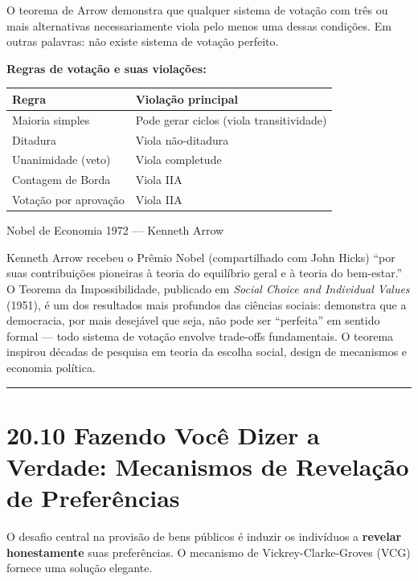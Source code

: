\documentclass[11pt,twoside,openright]{book}
\begin{document}
O teorema de Arrow demonstra que qualquer sistema de votação com três ou
mais alternativas necessariamente viola pelo menos uma dessas condições.
Em outras palavras: não existe sistema de votação perfeito.

\textbf{Regras de votação e suas violações:}

{\def\LTcaptype{none} %
\begin{longtable}[]{@{}ll@{}}
\toprule\noalign{}
Regra & Violação principal \\
\midrule\noalign{}
\endhead
\bottomrule\noalign{}
\endlastfoot
Maioria simples & Pode gerar ciclos (viola transitividade) \\
Ditadura & Viola não-ditadura \\
Unanimidade (veto) & Viola completude \\
Contagem de Borda & Viola IIA \\
Votação por aprovação & Viola IIA \\
\end{longtable}
}

\begin{infobox}{Nobel de Economia 1972 — Kenneth Arrow}

Kenneth Arrow recebeu o Prêmio Nobel (compartilhado com John Hicks)
``por suas contribuições pioneiras à teoria do equilíbrio geral e à
teoria do bem-estar.'' O Teorema da Impossibilidade, publicado em
\emph{Social Choice and Individual Values} (1951), é um dos resultados
mais profundos das ciências sociais: demonstra que a democracia, por
mais desejável que seja, não pode ser ``perfeita'' em sentido formal ---
todo sistema de votação envolve trade-offs fundamentais. O teorema
inspirou décadas de pesquisa em teoria da escolha social, design de
mecanismos e economia política.

\end{infobox}

\begin{center}\rule{0.5\linewidth}{0.5pt}\end{center}

\section{20.10 Fazendo Você Dizer a Verdade: Mecanismos de Revelação de
Preferências}\label{2010}

O desafio central na provisão de bens públicos é induzir os indivíduos a
\textbf{revelar honestamente} suas preferências. O mecanismo de
Vickrey-Clarke-Groves (VCG) fornece uma solução elegante.
\end{document}
